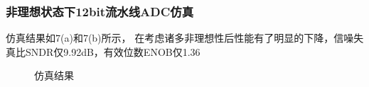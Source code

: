 \documentclass[10pt, mathserif]{beamer}	%
\newcommand{\ftitle}[1]{\frametitle{#1}}	%
\begin{document}
	\begin{frame}
		\ftitle{非理想状态下12bit流水线ADC仿真}
		仿真结果如7(a)和7(b)所示，
    	在考虑诸多非理想性后性能有了明显的下降，信噪失真比SNDR仅9.92dB，有效位数ENOB仅1.36
		\begin{figure}[H]
			\centering
			\centering
			\caption{仿真结果}
		\end{figure}

	\end{frame}
\end{document}
